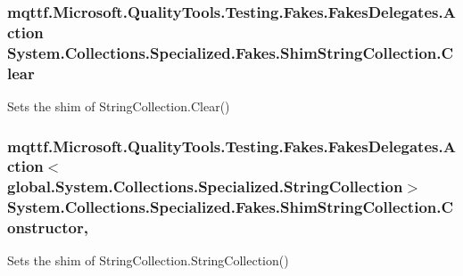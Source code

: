 \hypertarget{class_system_1_1_collections_1_1_specialized_1_1_fakes_1_1_shim_string_collection_a8ee276360bab898232a6589edbec2303}{
\subsubsection[{Clear}]{\setlength{\rightskip}{0pt plus 5cm}mqttf.\-Microsoft.\-Quality\-Tools.\-Testing.\-Fakes.\-Fakes\-Delegates.\-Action System.\-Collections.\-Specialized.\-Fakes.\-Shim\-String\-Collection.\-Clear\hspace{0.3cm}{\ttfamily [set]}}}\label{class_system_1_1_collections_1_1_specialized_1_1_fakes_1_1_shim_string_collection_a8ee276360bab898232a6589edbec2303}


Sets the shim of String\-Collection.\-Clear()

\hypertarget{class_system_1_1_collections_1_1_specialized_1_1_fakes_1_1_shim_string_collection_a01df25edc65b7ba1b23a15a76084117e}{
\subsubsection[{Constructor}]{\setlength{\rightskip}{0pt plus 5cm}mqttf.\-Microsoft.\-Quality\-Tools.\-Testing.\-Fakes.\-Fakes\-Delegates.\-Action$<$global.\-System.\-Collections.\-Specialized.\-String\-Collection$>$ System.\-Collections.\-Specialized.\-Fakes.\-Shim\-String\-Collection.\-Constructor\hspace{0.3cm}{\ttfamily [static]}, {\ttfamily [set]}}}\label{class_system_1_1_collections_1_1_specialized_1_1_fakes_1_1_shim_string_collection_a01df25edc65b7ba1b23a15a76084117e}


Sets the shim of String\-Collection.\-String\-Collection()

